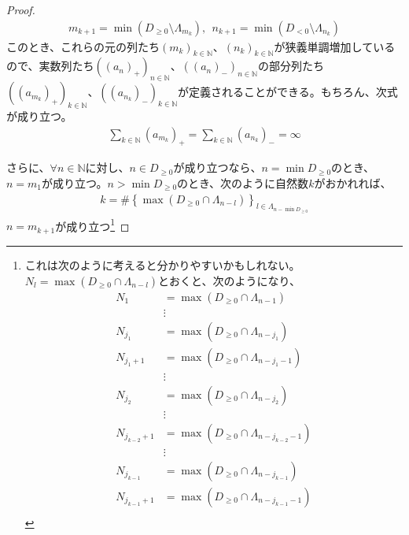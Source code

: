 \documentclass[dvipdfmx]{jsarticle}
\begin{document}
\begin{proof}
\begin{align*}
m_{k + 1} = \min\left( D_{\geq 0} \setminus \varLambda_{m_{k}} \right),\ \ n_{k + 1} = \min\left( D_{< 0} \setminus \varLambda_{n_{k}} \right)
\end{align*}
このとき、これらの元の列たち$\left( m_{k} \right)_{k \in \mathbb{N}}$、$\left( n_{k} \right)_{k \in \mathbb{N}}$が狭義単調増加しているので、実数列たち$\left( \left( a_{n} \right)_{+} \right)_{n \in \mathbb{N}}$、$\left( \left( a_{n} \right)_{-} \right)_{n \in \mathbb{N}}$の部分列たち$\left( \left( a_{m_{k}} \right)_{+} \right)_{k \in \mathbb{N}}$、$\left( \left( a_{n_{k}} \right)_{-} \right)_{k \in \mathbb{N}}$が定義されることができる。もちろん、次式が成り立つ。
\begin{align*}
\sum_{k \in \mathbb{N}} \left( a_{m_{k}} \right)_{+} = \sum_{k \in \mathbb{N}} \left( a_{n_{k}} \right)_{-} = \infty
\end{align*}\par
さらに、$\forall n \in \mathbb{N}$に対し、$n \in D_{\geq 0}$が成り立つなら、$n = \min D_{\geq 0}$のとき、$n = m_{1}$が成り立つ。$n > \min D_{\geq 0}$のとき、次のように自然数$k$がおかれれば、
\begin{align*}
k = \#\left\{ \max\left( D_{\geq 0} \cap \varLambda_{n - l} \right) \right\}_{l \in \varLambda_{n - \min D_{\geq 0}}}
\end{align*}
$n = m_{k + 1}$が成り立つ\footnote{これは次のように考えると分かりやすいかもしれない。$N_{l} = \max\left( D_{\geq 0} \cap \varLambda_{n - l} \right)$とおくと、次のようになり、
\begin{align*}
N_{1} &= \max\left( D_{\geq 0} \cap \varLambda_{n - 1} \right)\\
&\vdots \\
N_{j_{1}} &= \max\left( D_{\geq 0} \cap \varLambda_{n - j_{1}} \right)\\
N_{j_{1} + 1} &= \max\left( D_{\geq 0} \cap \varLambda_{n - j_{1} - 1} \right)\\
&\vdots \\
N_{j_{2}} &= \max\left( D_{\geq 0} \cap \varLambda_{n - j_{2}} \right)\\
&\vdots \\
N_{j_{k - 2} + 1} &= \max\left( D_{\geq 0} \cap \varLambda_{n - j_{k - 2} - 1} \right)\\
&\vdots \\
N_{j_{k - 1}} &= \max\left( D_{\geq 0} \cap \varLambda_{n - j_{k - 1}} \right)\\
N_{j_{k - 1} + 1} &= \max\left( D_{\geq 0} \cap \varLambda_{n - j_{k - 1} - 1} \right)\\

\end{align*}}
\end{proof}
\end{document}
